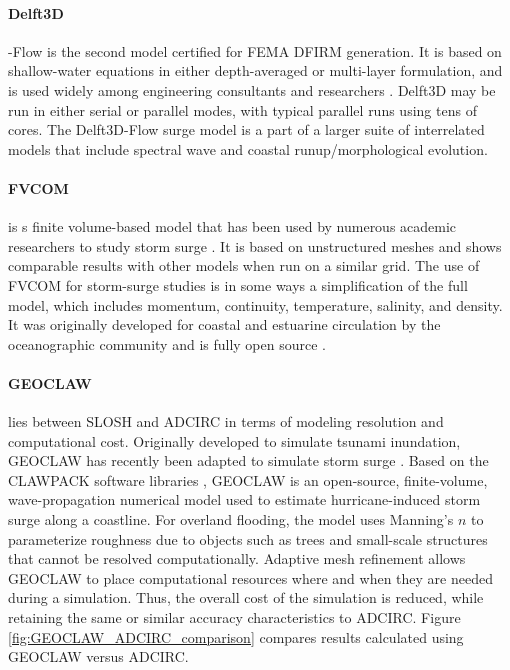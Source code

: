 \paragraph{Delft3D} -Flow is the second model certified for FEMA DFIRM generation. It is based on shallow-water equations in either depth-averaged or multi-layer formulation, and is used widely among engineering consultants and researchers \citep{hu2015numerical, vousdoukas2016projections}. Delft3D may be run in either serial or parallel modes, with typical parallel runs using tens of cores. The Delft3D-Flow surge model is a part of a larger suite of interrelated models that include spectral wave and coastal runup/morphological evolution. 

\paragraph{FVCOM}  is s finite volume-based model that has been used by numerous academic researchers to study storm surge \citep{kerr2013ioos, rego2010storm}. It is based on unstructured meshes and shows comparable results with other models when run on a similar grid. The use of FVCOM for storm-surge studies is in some ways a simplification of the full model, which includes momentum, continuity, temperature, salinity, and density. It was originally developed for coastal and estuarine circulation by the oceanographic community and is fully open source \citep{chen2003unstructured}. 

\paragraph{GEOCLAW}  lies between SLOSH and ADCIRC in terms of modeling resolution and computational cost. Originally developed to simulate tsunami inundation, GEOCLAW has recently been adapted to simulate storm surge \citep{berger2011geoclaw, mandli2016clawpack}. Based on the CLAWPACK software libraries \citep{leveque2002finite}, GEOCLAW is an open-source, finite-volume, wave-propagation numerical model used to estimate hurricane-induced storm surge along a coastline. For overland flooding, the model uses Manning's $n$ to parameterize roughness due to objects such as trees and small-scale structures that cannot be resolved computationally. Adaptive mesh refinement allows GEOCLAW to place computational resources where and when they are needed during a simulation. Thus, the overall cost of the simulation is reduced, while retaining the same or similar accuracy characteristics to ADCIRC. Figure \ref{fig:GEOCLAW_ADCIRC_comparison} compares results calculated using GEOCLAW versus ADCIRC. 

